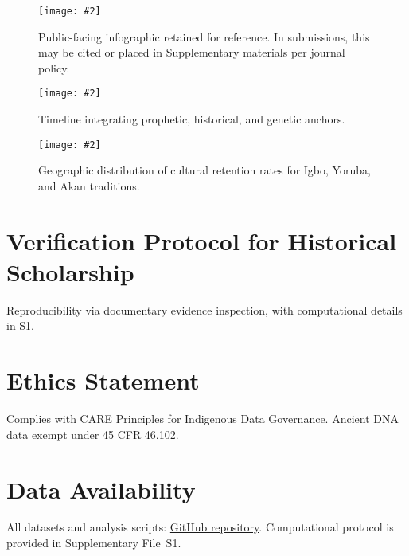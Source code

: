 \documentclass[11pt]{article}
\newcommand{\safeinclude}[2][0.95\linewidth]{%
  \texttt{[image: \#2]}%
}
\begin{document}
\begin{figure}[htbp]
  \centering
  \safeinclude[\linewidth]{deployment_infographic.png}
  \caption{Public-facing infographic retained for reference. In submissions, this may be cited or placed in Supplementary materials per journal policy.}
  \label{fig:infographic}
\end{figure}

\begin{figure}[htbp]
  \centering
  \safeinclude[\textwidth]{prophetic_historical_genetic_timeline_clean.png}
  \caption{Timeline integrating prophetic, historical, and genetic anchors.}
  \label{fig:timeline}
\end{figure}

\begin{figure}[htbp]
  \centering
  \safeinclude[0.8\textwidth]{cultural_retention_map.pdf}
  \caption{Geographic distribution of cultural retention rates for Igbo, Yoruba, and Akan traditions.}
  \label{fig:culture-map}
\end{figure}

\FloatBarrier

\section*{Verification Protocol for Historical Scholarship}
Reproducibility via documentary evidence inspection, with computational details in S1.

\section*{Ethics Statement}
Complies with CARE Principles for Indigenous Data Governance. Ancient DNA data exempt under 45 CFR 46.102.

\section*{Data Availability}
All datasets and analysis scripts: \href{https://github.com/NohMadLLC/The-Ephraim-Convergence-Prophecy-Genetics-and-the-Transatlantic-Diaspora}{GitHub repository}. Computational protocol is provided in Supplementary File~S1.

\printbibliography
\end{document}
